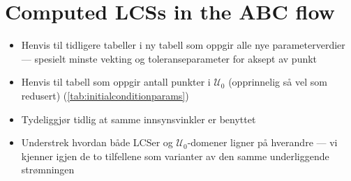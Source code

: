 \section{Computed LCSs in the ABC flow}
\label{sec:computed_lcss_in_the_abc_flow}

\begin{framed}
    \begin{itemize}
        \item Henvis til tidligere tabeller i ny tabell som oppgir alle
            nye parameterverdier --- spesielt minste vekting og toleranseparameter for aksept av punkt
        \item Henvis til tabell som oppgir antall punkter i $\mathcal{U}_{0}$ (opprinnelig så vel som redusert) (\cref{tab:initialconditionparams})
        \item Tydeliggjør tidlig at samme innsynsvinkler er benyttet
        \item Understrek hvordan både LCSer og $\mathcal{U}_{0}$-domener
            ligner på hverandre --- vi kjenner igjen de to tilfellene som
            varianter av den samme underliggende strømningen
    \end{itemize}
\end{framed}








